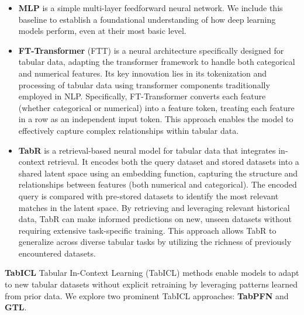 \begin{itemize}
    \item \textbf{MLP} is a simple multi-layer feedforward neural network. We include this baseline to establish a foundational understanding of how deep learning models perform, even at their most basic level.

    \item \textbf{FT-Transformer} (FTT) is a neural architecture specifically designed for tabular data, adapting the transformer framework to handle both categorical and numerical features. Its key innovation lies in its tokenization and processing of tabular data using transformer components traditionally employed in NLP. Specifically, FT-Transformer converts each feature (whether categorical or numerical) into a feature token, treating each feature in a row as an independent input token. This approach enables the model to effectively capture complex relationships within tabular data.

    \item \textbf{TabR} is a retrieval-based neural model for tabular data that integrates in-context retrieval. It encodes both the query dataset and stored datasets into a shared latent space using an embedding function, capturing the structure and relationships between features (both numerical and categorical). The encoded query is compared with pre-stored datasets to identify the most relevant matches in the latent space. By retrieving and leveraging relevant historical data, TabR can make informed predictions on new, unseen datasets without requiring extensive task-specific training. This approach allows TabR to generalize across diverse tabular tasks by utilizing the richness of previously encountered datasets.
\end{itemize}

\textbf{TabICL}
Tabular In-Context Learning (TabICL) methods enable models to adapt to new tabular datasets without explicit retraining by leveraging patterns learned from prior data. We explore two prominent TabICL approaches: \textbf{TabPFN} and \textbf{GTL}.

